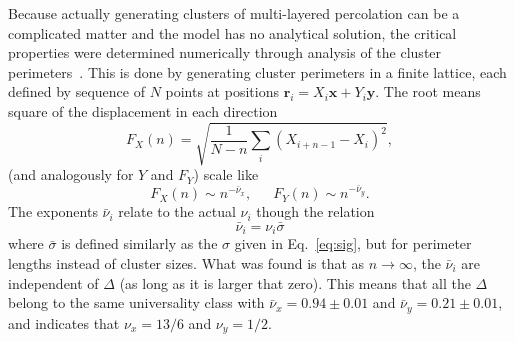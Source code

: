 Because actually generating clusters of multi-layered percolation can be a
complicated matter and the model has no analytical solution, the critical
properties were determined numerically through analysis of the cluster
perimeters~\cite{Dayan1991, Samyr2009, Parteli2010}. This is done by generating
cluster perimeters in a finite lattice, each defined by sequence of
$N$ points at positions $\mathbf{r}_i=X_i\mathbf{x}+Y_i\mathbf{y}$. The root
means square of the displacement in each direction
\begin{equation}
    F_{X}\left(n\right)=
    \sqrt{\frac{1}{N-n}\sum_{i}{\left(X_{i+n-1}-X_{i}\right)}^{2}},
\end{equation}
(and analogously for $Y$ and $F_Y$) scale like
\begin{equation}
    F_{X}\left(n\right)\sim n^{-\bar{\nu}_{x}},
    \,\,\,\,\,\,\,\,\,
    F_{Y}\left(n\right)\sim n^{-\bar{\nu}_{y}}.
\end{equation}
The exponents $\bar{\nu}_i$ relate to the actual $\nu_i$ though the relation
\begin{equation}
    \bar{\nu}_i = \nu_i \bar{\sigma}
\end{equation}
where $\bar{\sigma}$ is defined similarly as the $\sigma$ given in
Eq.~\ref{eq:sig}, but for perimeter lengths instead of cluster sizes.
What was found is that as $n\rightarrow\infty$, the $\bar{\nu}_i$ are
independent of $\Delta$ (as long as it is larger that zero).
This means that all the $\Delta$ belong to the same universality class
with $\bar{\nu}_x=0.94\pm0.01$ and $\bar{\nu}_y=0.21\pm0.01$, and
indicates that $\nu_x=13/6$ and $\nu_y=1/2$.


